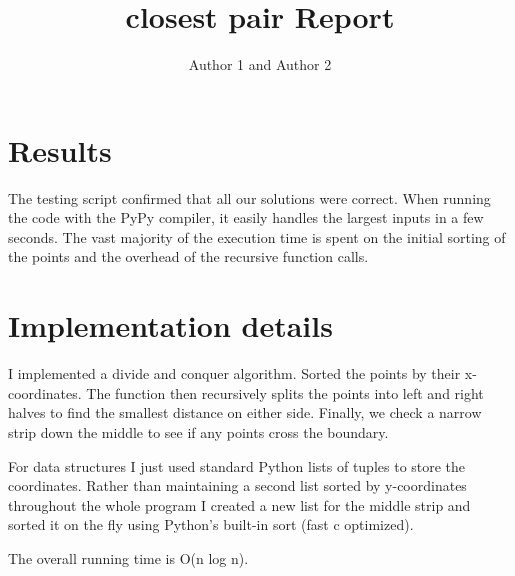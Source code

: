 \documentclass{article}
\title{closest pair Report}
\author{Author 1 and Author 2}
\begin{document}
  \maketitle

  \section{Results}
  The testing script confirmed that all our solutions were correct. When running the code with the PyPy compiler, it easily handles the largest inputs in a few seconds. The vast majority of the execution time is spent on the initial sorting of the points and the overhead of the recursive function calls. 

  \section{Implementation details}
  I implemented a divide and conquer algorithm. Sorted the points by their x-coordinates. The function then recursively splits the points into left and right halves to find the smallest distance on either side. Finally, we check a narrow strip down the middle to see if any points cross the boundary. 
  
  For data structures I just used standard Python lists of tuples to store the coordinates. Rather than maintaining a second list sorted by y-coordinates throughout the whole program I created a new list for the middle strip and sorted it on the fly using Python's built-in sort (fast c optimized). 
  
  The overall running time is O(n log n).
\end{document}
